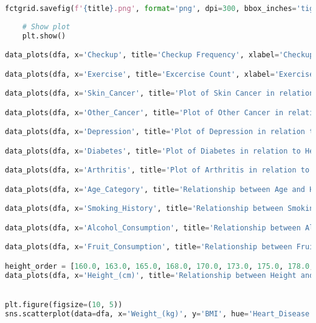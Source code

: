 \documentclass[12pt, a4paper,twoside]{report}
\numberwithin{equation}{chapter}
\begin{document}
\begin{lstlisting}[language=Python]
    fctgrid.savefig(f'{title}.png', format='png', dpi=300, bbox_inches='tight')
    
    # Show plot
    plt.show()

data_plots(dfa, x='Checkup', title='Checkup Frequency', xlabel='Checkup', ylabel='Count', hue='Heart_Disease')

data_plots(dfa, x='Exercise', title='Excercise Count', xlabel='Exercise', ylabel='Count', hue='Heart_Disease')

data_plots(dfa, x='Skin_Cancer', title='Plot of Skin Cancer in relation to Heart Disease', xlabel='Skin Cancer', ylabel='Count', hue='Heart_Disease')

data_plots(dfa, x='Other_Cancer', title='Plot of Other Cancer in relation to Heart_Disease', xlabel='Other Cancer', ylabel='Count', hue='Heart_Disease')

data_plots(dfa, x='Depression', title='Plot of Depression in relation to Heart_Disease', xlabel='Depression', ylabel='Count', hue='Heart_Disease')

data_plots(dfa, x='Diabetes', title='Plot of Diabetes in relation to Heart_Disease', xlabel='Diabetes', ylabel='Count', hue='Heart_Disease') 

data_plots(dfa, x='Arthritis', title='Plot of Arthritis in relation to Heart_Disease', xlabel='Arthritis', ylabel='Count', hue='Heart_Disease')

data_plots(dfa, x='Age_Category', title='Relationship between Age and Heart Disease', xlabel='Age_Category', ylabel='Count', hue='Heart_Disease')

data_plots(dfa, x='Smoking_History', title='Relationship between Smoking History and Heart Disease', xlabel='Smoking History', ylabel='Count', hue='Heart_Disease')

data_plots(dfa, x='Alcohol_Consumption', title='Relationship between Alcohol Consumption and Heart Disease', xlabel='Alcohol_Consumption', ylabel='Count', hue='Heart_Disease')

data_plots(dfa, x='Fruit_Consumption', title='Relationship between Fruit Consumption and Heart Disease', xlabel='Fruit_Consumption', ylabel='Count', hue='Heart_Disease')

height_order = [160.0, 163.0, 165.0, 168.0, 170.0, 173.0, 175.0, 178.0, 180.0, 183.0, 226.0]
data_plots(dfa, x='Height_(cm)', title='Relationship between Height and Heart Disease', xlabel='Height', ylabel='Count', hue='Heart_Disease', order=height_order)


plt.figure(figsize=(10, 5))
sns.scatterplot(data=dfa, x='Weight_(kg)', y='BMI', hue='Heart_Disease')


\end{lstlisting}
\end{document}
